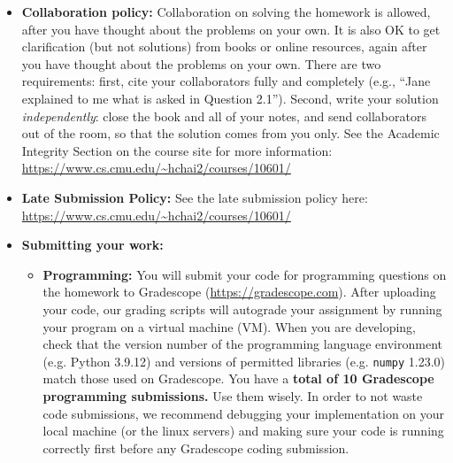\documentclass[11pt,addpoints,answers]{exam}
\begin{document}
\begin{itemize}
\item \textbf{Collaboration policy:} Collaboration on solving the homework is allowed, after you have thought about the problems on your own. It is also OK to get clarification (but not solutions) from books or online resources, again after you have thought about the problems on your own. There are two requirements: first, cite your collaborators fully and completely (e.g., ``Jane explained to me what is asked in Question 2.1''). Second, write your solution {\em independently}: close the book and all of your notes, and send collaborators out of the room, so that the solution comes from you only.  See the Academic Integrity Section on the course site for more information: \url{https://www.cs.cmu.edu/~hchai2/courses/10601/}

\item\textbf{Late Submission Policy:} See the late submission policy here: \url{https://www.cs.cmu.edu/~hchai2/courses/10601/}

\item\textbf{Submitting your work:} 

\begin{itemize}


\item \textbf{Programming:} You will submit your code for programming questions on the homework to Gradescope (\url{https://gradescope.com}). After uploading your code, our grading scripts will autograde your assignment by running your program on a virtual machine (VM). When you are developing, check that the version number of the programming language environment (e.g. Python 3.9.12) and versions of permitted libraries (e.g.  \texttt{numpy} 1.23.0) match those used on Gradescope. You have a \textbf{total of 10 Gradescope programming submissions.} Use them wisely. In order to not waste code submissions, we recommend debugging your implementation on your local machine (or the linux servers) and making sure your code is running correctly first before any Gradescope coding submission.


\end{itemize}
\end{itemize}
\end{document}
